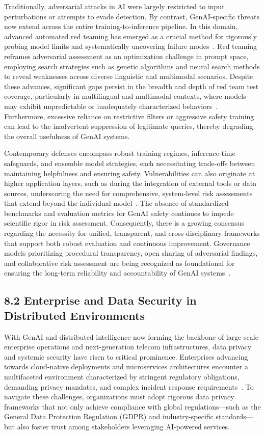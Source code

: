 \documentclass[11pt]{article}
\begin{document}
Traditionally, adversarial attacks in AI were largely restricted to input perturbations or attempts to evade detection. By contrast, GenAI-specific threats now extend across the entire training-to-inference pipeline. In this domain, advanced automated red teaming has emerged as a crucial method for rigorously probing model limits and systematically uncovering failure modes~\cite{ref3}. Red teaming reframes adversarial assessment as an optimization challenge in prompt space, employing search strategies such as genetic algorithms and neural search methods to reveal weaknesses across diverse linguistic and multimodal scenarios. Despite these advances, significant gaps persist in the breadth and depth of red team test coverage, particularly in multilingual and multimodal contexts, where models may exhibit unpredictable or inadequately characterized behaviors~\cite{ref3}. Furthermore, excessive reliance on restrictive filters or aggressive safety training can lead to the inadvertent suppression of legitimate queries, thereby degrading the overall usefulness of GenAI systems.

Contemporary defenses encompass robust training regimes, inference-time safeguards, and ensemble model strategies, each necessitating trade-offs between maintaining helpfulness and ensuring safety. Vulnerabilities can also originate at higher application layers, such as during the integration of external tools or data sources, underscoring the need for comprehensive, system-level risk assessments that extend beyond the individual model~\cite{ref3}. The absence of standardized benchmarks and evaluation metrics for GenAI safety continues to impede scientific rigor in risk assessment. Consequently, there is a growing consensus regarding the necessity for unified, transparent, and cross-disciplinary frameworks that support both robust evaluation and continuous improvement. Governance models prioritizing procedural transparency, open sharing of adversarial findings, and collaborative risk assessment are being recognized as foundational for ensuring the long-term reliability and accountability of GenAI systems~\cite{ref3,ref7}.

\subsection{8.2 Enterprise and Data Security in Distributed Environments}

With GenAI and distributed intelligence now forming the backbone of large-scale enterprise operations and next-generation telecom infrastructures, data privacy and systemic security have risen to critical prominence. Enterprises advancing towards cloud-native deployments and microservices architectures encounter a multifaceted environment characterized by stringent regulatory obligations, demanding privacy mandates, and complex incident response requirements~\cite{ref17,ref18,ref19}. To navigate these challenges, organizations must adopt rigorous data privacy frameworks that not only achieve compliance with global regulations—such as the General Data Protection Regulation (GDPR) and industry-specific standards—but also foster trust among stakeholders leveraging AI-powered services.
\end{document}
